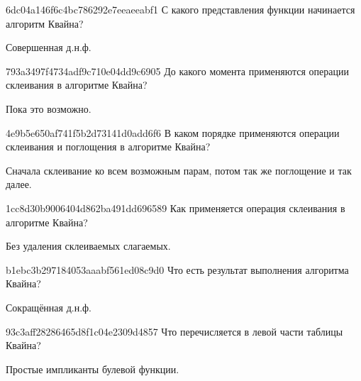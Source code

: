 \begin{note}{6dc04a146f6c4bc786292e7eeaeeabf1}
    С какого представления функции начинается алгоритм Квайна?

    \begin{cloze}{1}
        Совершенная д.н.ф.
    \end{cloze}
\end{note}

\begin{note}{793a3497f4734adf9c710e04dd9c6905}
    До какого момента применяются операции склеивания в алгоритме Квайна?

    \begin{cloze}{1}
        Пока это возможно.
    \end{cloze}
\end{note}

\begin{note}{4e9b5e650af741f5b2d73141d0add6f6}
    В каком порядке применяются операции склеивания и поглощения в алгоритме Квайна?

    \begin{cloze}{1}
        Сначала склеивание ко всем возможным парам, потом так же поглощение и так далее.
    \end{cloze}
\end{note}

\begin{note}{1cc8d30b9006404d862ba491dd696589}
    Как применяется операция склеивания в алгоритме Квайна?

    \begin{cloze}{1}
        Без удаления склеиваемых слагаемых.
    \end{cloze}
\end{note}

\begin{note}{b1ebc3b297184053aaabf561ed08c9d0}
    Что есть результат выполнения алгоритма Квайна?

    \begin{cloze}{1}
        Сокращённая д.н.ф.
    \end{cloze}
\end{note}

\begin{note}{93c3aff28286465d8f1c04e2309d4857}
    Что перечисляется в левой части таблицы Квайна?

    \begin{cloze}{1}
        Простые импликанты булевой функции.
    \end{cloze}
\end{note}

